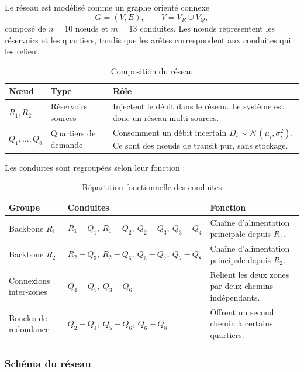 \documentclass[11pt]{ama-article}
\begin{document}
Le réseau est modélisé comme un graphe orienté connexe
\[
G = (V,E), \qquad V = V_R \cup V_Q,
\]
composé de $n=10$ nœuds et $m=13$ conduites. Les nœuds représentent les réservoirs et les
quartiers, tandis que les arêtes correspondent aux conduites qui les relient.

\begin{table}[h!]
\centering
\begin{tabular}{>{\raggedright\arraybackslash}p{3cm}
                >{\raggedright\arraybackslash}p{4cm}
                >{\raggedright\arraybackslash}p{7.3cm}}
\toprule
\textbf{Nœud} & \textbf{Type} & \textbf{Rôle} \\
\midrule
$R_1,R_2$ &
Réservoirs sources &
Injectent le débit dans le réseau. Le système est donc un réseau multi-sources. \\
$Q_1,\ldots,Q_8$ &
Quartiers de demande &
Consomment un débit incertain $D_i\sim\mathcal{N}(\mu_i,\sigma_i^2)$. Ce sont des nœuds de
transit pur, sans stockage. \\
\bottomrule
\end{tabular}
\caption{Composition du réseau}
\end{table}

Les conduites sont regroupées selon leur fonction :

\begin{table}[h!]
\centering
\begin{tabular}{>{\raggedright\arraybackslash}p{3.5cm}
                >{\raggedright\arraybackslash}p{6cm}
                >{\raggedright\arraybackslash}p{5cm}}
\toprule
\textbf{Groupe} & \textbf{Conduites} & \textbf{Fonction} \\
\midrule
Backbone $R_1$ &
$R_1\!-\!Q_1,\ R_1\!-\!Q_2,\ Q_2\!-\!Q_3,\ Q_3\!-\!Q_4$ &
Chaîne d'alimentation principale depuis $R_1$. \\
Backbone $R_2$ &
$R_2\!-\!Q_5,\ R_2\!-\!Q_6,\ Q_6\!-\!Q_7,\ Q_7\!-\!Q_8$ &
Chaîne d'alimentation principale depuis $R_2$. \\
Connexions inter-zones &
$Q_4\!-\!Q_5,\ Q_3\!-\!Q_6$ &
Relient les deux zones par deux chemins indépendants. \\
Boucles de redondance &
$Q_2\!-\!Q_4,\ Q_5\!-\!Q_6,\ Q_6\!-\!Q_8$ &
Offrent un second chemin à certains quartiers. \\
\bottomrule
\end{tabular}
\caption{Répartition fonctionnelle des conduites}
\end{table}

\subsubsection{Schéma du réseau}
\end{document}
